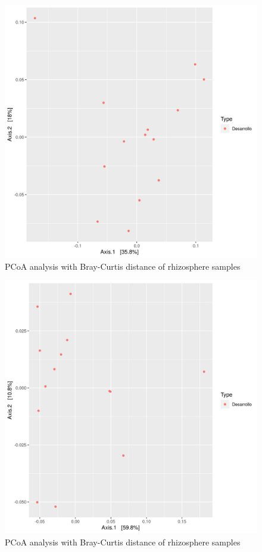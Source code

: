 \documentclass{article}
\begin{document}
\begin{figure}
   \centering
   \includegraphics[scale = 0.7]{pcoa_muestras_tomate_desarrollo.csv.png}
 \caption{PCoA analysis with Bray-Curtis distance of rhizosphere samples }%
 \label{fig:tomate_desarrollo.csv_pcoa}
\end{figure}
\begin{figure}
  \centering
  \includegraphics[scale = 0.7]{pcoa_key_otus_tomate_desarrollo.csv.png}
  \caption{PCoA analysis with Bray-Curtis distance of rhizosphere samples }%
  \label{fig:tomate_desarrollo.csv_pcoa_key_otus}
\end{figure}
\end{document}
